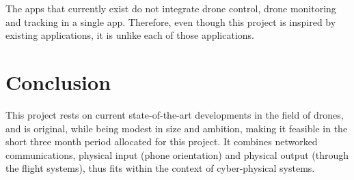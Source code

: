 \documentclass[10pt,letterpaper]{article}
\begin{document}
The apps that currently exist do not integrate drone control, drone monitoring and tracking in a single app. Therefore, even though this project is inspired by existing applications, it is unlike each of those applications.

\section*{Conclusion}
This project rests on current state-of-the-art developments in the field of drones, and is original, while being modest in size and ambition, making it feasible in the short three month period allocated for this project. It combines networked communications, physical input (phone orientation) and physical output (through the flight systems), thus fits within the context of cyber-physical systems. 



\end{document}
